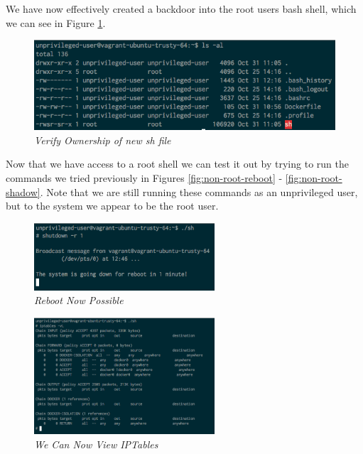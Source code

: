 \documentclass{article}
\begin{document}
We have now effectively created a backdoor into the root users bash shell, which we can see in Figure \ref{fig:verify-ownership}.

\begin{figure}[!h]
\centering
\includegraphics*[width=\textwidth]{components/images/verify-ownership}
\caption{\em Verify Ownership of new sh file}
\label{fig:verify-ownership}
\end{figure}

Now that we have access to a root shell we can test it out by trying to run the commands we tried previously in Figures \ref{fig:non-root-reboot} - \ref{fig:non-root-shadow}. Note that we are still running these commands as an unprivileged user, but to the system we appear to be the root user. \newline \newline \newline

\begin{figure}[!h]
\centering
\includegraphics*[width=0.6\textwidth]{components/images/root-reboot}
\caption{\em Reboot Now Possible}
\label{fig:root-reboot}
\end{figure}

\begin{figure}[!h]
\centering
\includegraphics*[width=0.6\textwidth]{components/images/root-iptables}
\caption{\em We Can Now View IPTables}
\label{fig:root-iptables}
\end{figure}
\end{document}
